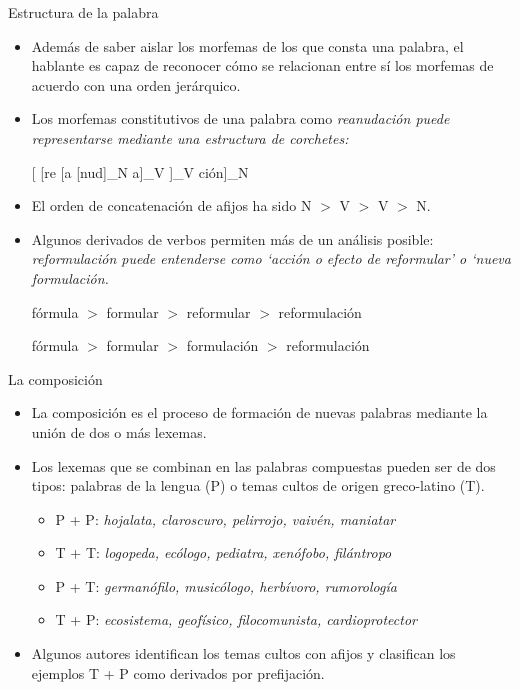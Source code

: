 \documentclass{beamer}
\begin{document}
\begin{frame}{Estructura de la palabra}

\begin{itemize}
	\item Además de saber aislar los morfemas de los que consta una palabra, el hablante es capaz de reconocer cómo se relacionan entre sí los morfemas de acuerdo con una orden jerárquico.
	\item Los morfemas constitutivos de una palabra como \it{reanudación} puede representarse mediante una estructura de corchetes: 
	 
	 \begin{center}
	 [ [re [a [nud]_{N} a]_{V} ]_{V} ción]_{N}
	 \end{center}
	  
	\item El orden de concatenación de afijos ha sido N $>$ V $>$ V $>$ N.
	\item Algunos derivados de verbos permiten más de un análisis posible: \it{reformulación} puede entenderse como `acción o efecto de reformular' o `nueva formulación.
	
	 \begin{center}
	 fórmula $>$ formular $>$ reformular $>$ reformulación
	 
	 fórmula $>$ formular $>$ formulación $>$ reformulación
	 \end{center}
\end{itemize}

\end{frame}

\begin{frame}{La composición}

\begin{itemize}
	\item La composición es el proceso de formación de nuevas palabras mediante la unión de dos o más lexemas.
	\item Los lexemas que se combinan en las palabras compuestas pueden ser de dos tipos: palabras de la lengua (P) o temas cultos de origen greco-latino (T).
	\begin{itemize}
		\item P + P: \it{hojalata, claroscuro, pelirrojo, vaivén, maniatar}
		\item T + T: \it{logopeda, ecólogo, pediatra, xenófobo, filántropo}
		\item P + T: \it{germanófilo, musicólogo, herbívoro, rumorología}
		\item T + P: \it{ecosistema, geofísico, filocomunista, cardioprotector}
	\end{itemize}
	\item Algunos autores identifican los temas cultos con afijos y clasifican los ejemplos T + P como derivados por prefijación. 
\end{itemize}
\end{frame}
\end{document}
